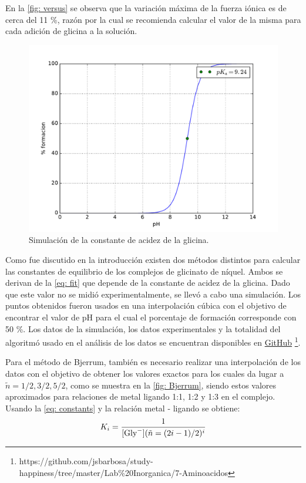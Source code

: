 \documentclass[fleqn,10pt]{SelfArx} %
\begin{document}
	En la \autoref{fig: versus} se observa que la variaci\'on m\'axima de la fuerza i\'onica es de cerca del 11 \%, raz\'on por la cual se recomienda calcular el valor de la misma para cada adici\'on de glicina a la soluci\'on.
	\begin{figure}[h]
		\centering
		\includegraphics[width=\linewidth]{images/pka_sim.pdf}
		\caption{Simulaci\'on de la constante de acidez de la glicina.}
	\end{figure}
	
	Como fue discutido en la introducci\'on existen dos m\'etodos distintos para calcular las constantes de equilibrio de los complejos de glicinato de n\'iquel. Ambos se derivan de la \autoref{eq: fit} que depende de la constante de acidez de la glicina. Dado que este valor no se midi\'o experimentalmente, se llev\'o a cabo una simulaci\'on. Los puntos obtenidos fueron usados en una interpolaci\'on c\'ubica con el objetivo de encontrar el valor de pH para el cual el porcentaje de formaci\'on corresponde con 50 \%. Los datos de la simulaci\'on, los datos experimentales y la totalidad del algoritm\'o usado en el an\'alisis de los datos se encuentran disponibles en \href{https://github.com/jsbarbosa/study-happiness/tree/master/Lab\%20Inorganica/7-Aminoacidos}{\color{blue}GitHub} \footnote{https://github.com/jsbarbosa/study-happiness/tree/master/Lab\%20Inorganica/7-Aminoacidos}.
	
	Para el m\'etodo de Bjerrum, tambi\'en es necesario realizar una interpolaci\'on de los datos con el objetivo de obtener los valores exactos para los cuales \ce{[Gly^{-}]} da lugar a $\tilde{n} = 1/2, 3/2, 5/2$, como se muestra en la \autoref{fig: Bjerrum}, siendo estos valores aproximados para relaciones de metal ligando 1:1, 1:2 y 1:3 en el complejo. Usando la \autoref{eq: constants} y la relaci\'on metal - ligando se obtiene:
	\begin{equation}
		K_i = \dfrac{1}{\ce{[Gly^-]}(\tilde{n} = (2i-1)/2)^i}
	\end{equation}
	
\end{document}
